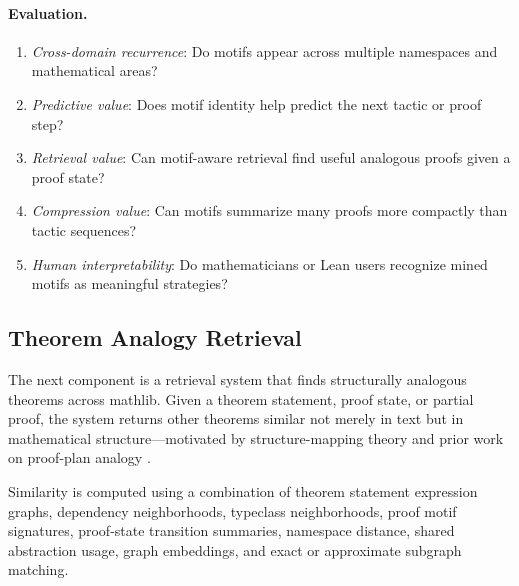 \documentclass[12pt, a4paper]{article}
\begin{document}
\paragraph{Evaluation.}
\begin{enumerate}[leftmargin=1.5em]
  \item \textit{Cross-domain recurrence}: Do motifs appear across multiple
        namespaces and mathematical areas?
  \item \textit{Predictive value}: Does motif identity help predict the next
        tactic or proof step?
  \item \textit{Retrieval value}: Can motif-aware retrieval find useful
        analogous proofs given a proof state?
  \item \textit{Compression value}: Can motifs summarize many proofs more
        compactly than tactic sequences?
  \item \textit{Human interpretability}: Do mathematicians or Lean users
        recognize mined motifs as meaningful strategies?
\end{enumerate}

\subsection{Theorem Analogy Retrieval}
\label{sec:retrieval}

The next component is a retrieval system that finds structurally analogous
theorems across mathlib. Given a theorem statement, proof state, or partial
proof, the system returns other theorems similar not merely in text but in
mathematical structure---motivated by structure-mapping theory
\citep{gentner1983, falkenhainer1989sme} and prior work on proof-plan
analogy \citep{melis1994}.

Similarity is computed using a combination of theorem statement expression
graphs, dependency neighborhoods, typeclass neighborhoods, proof motif
signatures, proof-state transition summaries, namespace distance, shared
abstraction usage, graph embeddings, and exact or approximate subgraph
matching.
\end{document}
